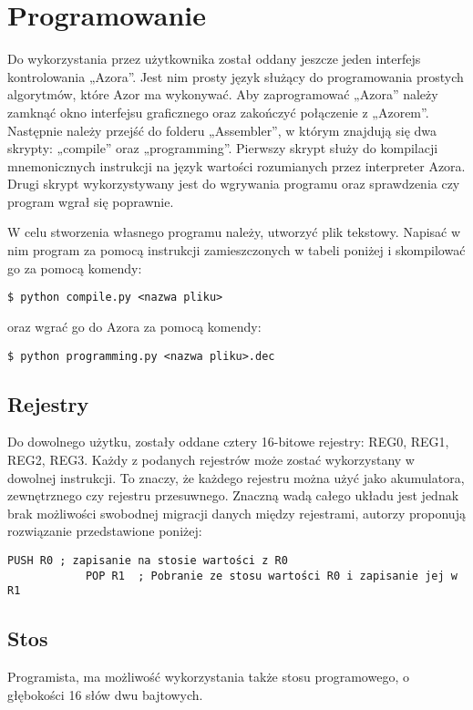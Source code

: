 \section{Programowanie}
    \tab Do wykorzystania przez użytkownika został oddany jeszcze jeden interfejs kontrolowania „Azora”.
    Jest nim prosty język służący do programowania prostych algorytmów, które Azor ma wykonywać.
    Aby zaprogramować „Azora” należy zamknąć okno interfejsu graficznego oraz zakończyć połączenie z „Azorem”. 
    Następnie należy przejść do folderu „Assembler”, w którym znajdują się dwa skrypty: „compile” oraz „programming”.
    Pierwszy skrypt służy do kompilacji mnemonicznych instrukcji na język wartości rozumianych przez interpreter Azora.
    Drugi skrypt wykorzystywany jest do wgrywania programu oraz sprawdzenia czy program wgrał się poprawnie.

    W celu stworzenia własnego programu należy, utworzyć plik tekstowy. Napisać w nim program za pomocą instrukcji zamieszczonych w tabeli poniżej i skompilować go za pomocą komendy:
    \begin{lstlisting}[gobble = 8, frame = L]
        $ python compile.py <nazwa pliku>
    \end{lstlisting}
    oraz wgrać go do Azora za pomocą komendy:
    \begin{lstlisting}[gobble = 8, frame = L]
        $ python programming.py <nazwa pliku>.dec
    \end{lstlisting}


    \subsection{Rejestry}
        \tab Do dowolnego użytku, zostały oddane cztery 16-bitowe rejestry: REG0, REG1, REG2, REG3.
        Każdy z podanych rejestrów może zostać wykorzystany w dowolnej instrukcji.
        To znaczy, że każdego rejestru można użyć jako akumulatora, zewnętrznego czy rejestru przesuwnego.
        Znaczną wadą całego układu jest jednak brak możliwości swobodnej migracji danych między rejestrami, autorzy proponują rozwiązanie przedstawione poniżej:
        \begin{lstlisting}[gobble = 8, frame = L, caption={Skopiowanie wartości z Rejestru 0 do Rejestru 1}, captionpos=b]
            PUSH R0 ; zapisanie na stosie wartości z R0
            POP R1  ; Pobranie ze stosu wartości R0 i zapisanie jej w R1
        \end{lstlisting}

    \subsection{Stos}
        \tab Programista, ma możliwość wykorzystania także stosu programowego, o głębokości 16 słów dwu bajtowych.

